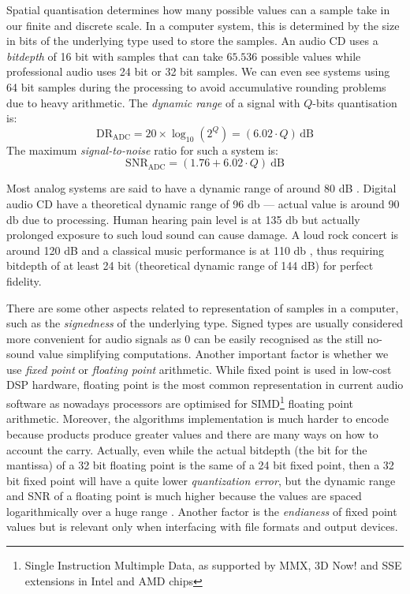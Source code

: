 Spatial quantisation determines how many possible values can a sample
take in our finite and discrete scale. In a computer system, this is
determined by the size in bits of the underlying type used to store
the samples. An audio CD uses a \emph{bitdepth} of 16 bit with samples
that can take $65.536$ possible values while professional audio uses 24
bit or 32 bit samples. We can even see systems using 64 bit samples
during the processing to avoid accumulative rounding problems due to
heavy arithmetic. The \emph{dynamic range} of a signal with $Q$-bits
quantisation is:
\begin{equation}
  \mathrm{DR_{ADC}} = 20 \times \log_{10}(2^Q) = (6.02 \cdot Q)\, \mathrm{dB}
\end{equation}
The maximum \emph{signal-to-noise} ratio for such a system is:
\begin{equation}
  \mathrm{SNR_{ADC}} =  \left (1.76 + 6.02 \cdot Q \right )\ \mathrm{dB}
\end{equation}

Most analog systems are said to have a dynamic range of around 80 dB
\cite{fries05digital}. Digital audio CD have a theoretical
dynamic range of 96 db --- actual value is around 90 db due to
processing. Human hearing pain level is at 135 db but actually
prolonged exposure to such loud sound can cause damage. A loud rock
concert is around 120 dB and a classical music performance is at
110 db \cite{ludwig09music}, thus requiring bitdepth of at least 24
bit (theoretical dynamic range of 144 dB) for perfect fidelity.

There are some other aspects related to representation of samples in a
computer, such as the \emph{signedness} of the underlying type. Signed
types are usually considered more convenient for audio signals as 0
can be easily recognised as the still no-sound value simplifying
computations. Another important factor is whether we use \emph{fixed
  point} or \emph{floating point} arithmetic. While fixed point is
used in low-cost DSP hardware, floating point is the most common
representation in current audio software as nowadays processors are
optimised for SIMD\footnote{Single Instruction Multimple Data, as
  supported by MMX, 3D Now! and SSE extensions in Intel and AMD chips}
floating point arithmetic. Moreover, the algorithms implementation is
much harder to encode because products produce greater values and
there are many ways on how to account the carry.  Actually, even while
the actual bitdepth (the bit for the mantissa) of a 32 bit floating
point is the same of a 24 bit fixed point, then a 32 bit fixed point
will have a quite lower \emph{quantization error}, but the dynamic
range and SNR of a floating point is much higher because the
values are spaced logarithmically over a huge range
\cite{smith02dsp}. Another factor is the \emph{endianess} of fixed
point values but is relevant only when interfacing with file formats
and output devices.

